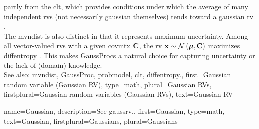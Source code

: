 {{		partly from the \gls{clt}, which provides conditions under which 
		the average of many independent \glspl{rv} (not necessarily \gls{gaussian} themselves) 
		tends toward a \gls{gaussian} \gls{rv} \cite{ross2013first}.
		\\ 
		The \gls{mvndist} is also distinct in that it represents \gls{maximum} \gls{uncertainty}. 
		Among all \gls{vector}-valued \glspl{rv} with a given \gls{covmtx} ${\bf C}$, the 
		\gls{rv} ${\bf x} \sim \mathcal{N}\left(\bm \mu,\mathbf{C}\right)$ maximizes \gls{diffentropy} 
		\cite[Th. 8.6.5]{coverthomas}. This makes \glspl{GaussProc} a natural choice for 
		capturing \gls{uncertainty} or the lack of (domain) knowledge.
		\\ 
		See also: \gls{mvndist}, \gls{GaussProc}, \gls{probmodel}, \gls{clt}, \gls{diffentropy}.},
	first={Gaussian random variable (Gaussian RV)},
	type=math, 
	plural={Gaussian RVs}, 
	firstplural={Gaussian random variables (Gaussian RVs)}, 
	text={Gaussian RV}
}

{name={Gaussian}, 
	description={See \gls{gaussrv}.},
 	first={Gaussian},
 	type=math,
 	text={Gaussian},
	firstplural={Gaussians},  
 	plural={Gaussians}
}

